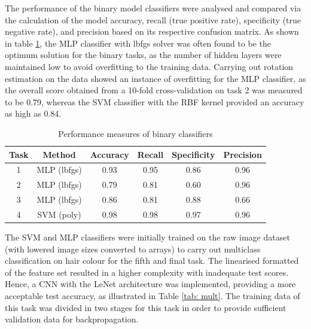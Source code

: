 \documentclass[conference]{IEEEtran}
\begin{document}
The performance of the binary model classifiers were analysed and compared via the calculation of the model accuracy, recall (true positive rate), specificity (true negative rate), and precision based on its respective confusion matrix. 
As shown in table \ref{tab: bin}, the MLP classifier with lbfgs solver was often found to be the optimum solution for the binary tasks, as the number of hidden layers were maintained low to avoid overfitting to the training data. 
Carrying out rotation estimation on the data showed an instance of overfitting for the MLP classifier, as the overall score obtained from a 10-fold cross-validation on task 2 was measured to be 0.79, whereas the SVM classifier with the RBF kernel provided an accuracy as high as 0.84.

\begin{table}[htp]
\caption{Performance measures of binary classifiers}
\begin{center}
\renewcommand{\arraystretch}{1.5}
\begin{tabular}{|c|c|c|c|c|c|}
\hline
Task & Method & Accuracy & Recall & Specificity & Precision\\ \hline
1 & MLP (lbfgs) & 0.93 & 0.95 & 0.86 & 0.96\\ \hline
2 & MLP (lbfgs) & 0.79 & 0.81 & 0.60 & 0.96\\ \hline
3 & MLP (lbfgs) & 0.86 & 0.81 & 0.88 & 0.66\\ \hline
4& SVM (poly) & 0.98 & 0.98 & 0.97 & 0.96\\ \hline
\end{tabular}
\end{center}
\label{tab: bin}
\end{table}%

The SVM and MLP classifiers were initially trained on the raw image dataset (with lowered image sizes converted to arrays) to carry out multiclass classification on hair colour for the fifth and final task. The linearised formatted of the feature set resulted in a higher complexity with inadequate test scores. Hence, a CNN with the LeNet architecture was implemented, providing a more acceptable test accuracy, as illustrated in Table \ref{tab: mult}.
The training data of this task was divided in two stages for this task in order to provide sufficient validation data for backpropagation. 
\end{document}
